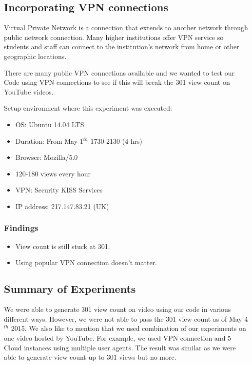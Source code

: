 \documentclass[conference]{IEEEtran}
\begin{document}
\subsection{Incorporating VPN connections}

Virtual Private Network is a connection that extends to another network through public network connection. Many higher institutions offer VPN service so students and staff can connect to the institution’s network from home or other geographic locations.

There are many public VPN connections available and we wanted to test our Code using VPN connections to see if this will break the 301 view count on YouTube videos.

Setup environment where this experiment was executed:
\begin{itemize}
  \setlength\itemsep{-0.1em}
  \item OS: Ubuntu 14.04 LTS
  \item Duration: From May 1$^{th}$ 1730-2130 (4 hrs)
  \item Browser: Mozilla/5.0
  \item 120-180 views every hour
  \item VPN: Security KISS Services
  \item IP address: 217.147.83.21 (UK)
\end{itemize}

\subsubsection*{Findings}
\begin{itemize}
  \setlength\itemsep{-0.1em}
  \item View count is still stuck at 301.
  \item Using popular VPN connection doesn’t matter.
\end{itemize}

\subsection{Summary of Experiments}

We were able to generate 301 view count on video using our code in various different ways. However, we were not able to pass the 301 view count as of May 4$^{th}$ 2015. We also like to mention that we used combination of our experiments on one video hosted by YouTube. For example, we used VPN connection and 5 Cloud instances using multiple user agents. The result was similar as we were able to generate view count up to 301 views but no more.
\end{document}
